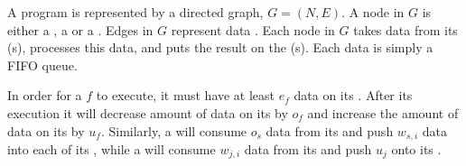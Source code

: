 A {\StreamIt} program is represented by a directed graph, $G = (N,
E)$.  A node in $G$ is either a {\filter}, a {\splitter} or a
{\joiner}. Edges in $G$ represent data {\Channels}.  Each node in
$G$ takes data from its {\Input} {\Channel}(s), processes this data,
and puts the result on the {\Output} {\Channel}(s).  Each data
{\Channel} is simply a FIFO queue.

In order for a \filter $f$ to execute, it must have at least $e_f$
data on its \Input \Channel. After its execution it will decrease
amount of data on its \Input \Channel by $o_f$ and increase the
amount of data on its \Output \Channel by $u_f$. Similarly, a
\splitter will consume $o_s$ data from its \Input \Channel and
push $w_{s,i}$ data into each of its \Output \Channels, while a
\joiner will consume $w_{j,i}$ data from its \Input \Channels and
push $u_j$ onto its \Output \Channel.

